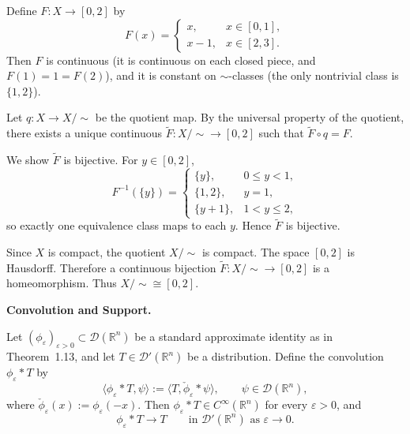 \begin{solution}
Define $F:X\to[0,2]$ by
	\[
	F(x)=
	\begin{cases}
		x,& x\in[0,1],\\[2pt]
		x-1,& x\in[2,3].
	\end{cases}
	\]
	Then $F$ is continuous (it is continuous on each closed piece, and $F(1)=1=F(2)$), and it is constant on $\sim$-classes (the only nontrivial class is $\{1,2\}$).

	Let $q:X\to X/\!\sim$ be the quotient map. By the universal property of the quotient, there exists a unique continuous $\tilde F:X/\!\sim\to[0,2]$ such that $\tilde F\circ q=F$.

	We show $\tilde F$ is bijective. For $y\in[0,2]$,
	\[
	F^{-1}(\{y\})=
	\begin{cases}
		\{y\},& 0\le y<1,\\
		\{1,2\},& y=1,\\
		\{y+1\},& 1<y\le 2,
	\end{cases}
	\]
	so exactly one equivalence class maps to each $y$. Hence $\tilde F$ is bijective.

	Since $X$ is compact, the quotient $X/\!\sim$ is compact. The space $[0,2]$ is Hausdorff. Therefore a continuous bijection $\tilde F:X/\!\sim\to[0,2]$ is a homeomorphism. Thus $X/\!\sim \cong [0,2]$.
\end{solution}

\begin{problem}[CP-II-0422]
\label{prob:cp-ii-0422}
\textbf{Convolution and Support.}

\begin{lemma}
	Let $(\phi_\varepsilon)_{\varepsilon>0}\subset \mathcal{D}(\mathbb{R}^n)$
	be a standard approximate identity as in Theorem~1.13, and let
	$T\in\mathcal{D}'(\mathbb{R}^n)$ be a distribution. Define the
	convolution $\phi_\varepsilon * T$ by
	\[
	\langle \phi_\varepsilon * T, \psi\rangle
	:= \big\langle T, \check{\phi}_\varepsilon * \psi \big\rangle,
	\qquad \psi\in\mathcal{D}(\mathbb{R}^n),
	\]
	where $\check{\phi}_\varepsilon(x):=\phi_\varepsilon(-x)$. Then
	$\phi_\varepsilon * T \in C^\infty(\mathbb{R}^n)$ for every
	$\varepsilon>0$, and
	\[
	\phi_\varepsilon * T \longrightarrow T
	\qquad\text{in }\mathcal{D}'(\mathbb{R}^n)\text{ as }\varepsilon\to0.
	\]
\end{lemma}
\end{problem}

